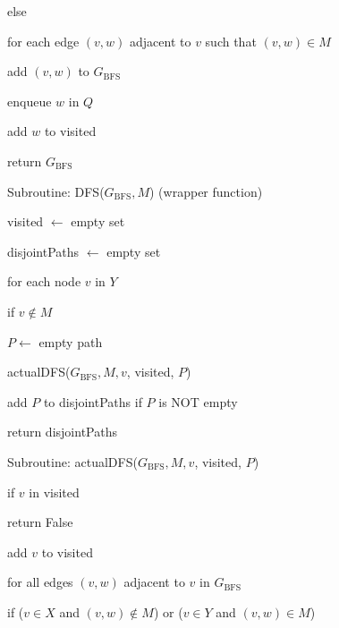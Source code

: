 \documentclass{article}
\begin{document}
\hspace{2cm} else

\hspace{3cm} for each edge $(v, w)$ adjacent to $v$ such that $(v, w) \in M$

\hspace{4cm} add $(v, w)$ to $G_{\mathrm{BFS}}$

\hspace{4cm} enqueue $w$ in $Q$

\hspace{4cm} add $w$ to visited

\hspace{1cm} return $G_{\mathrm{BFS}}$

Subroutine: DFS($G_{\mathrm{BFS}}, M$) (wrapper function) \dotfill

\hspace{1cm} visited $\leftarrow$ empty set

\hspace{1cm} disjointPaths $\leftarrow$ empty set

\hspace{1cm} for each node $v$ in $Y$

\hspace{2cm} if $v \notin M$

\hspace{3cm} $P \leftarrow$ empty path 

\hspace{3cm} actualDFS($G_{\mathrm{BFS}}, M, v$, visited, $P$)

\hspace{3cm} add $P$ to disjointPaths if $P$ is NOT empty

\hspace{1cm} return disjointPaths

\vspace{0.5cm}

Subroutine: actualDFS($G_{\mathrm{BFS}}, M, v$, visited, $P$) \dotfill

\hspace{1cm} if $v$ in visited

\hspace{2cm} return False

\hspace{1cm} add $v$ to visited

\hspace{1cm} for all edges $(v, w)$ adjacent to $v$ in $G_{\mathrm{BFS}}$

\hspace{2cm} if ($v \in X$ and $(v,w) \notin M$) or ($v \in Y$ and $(v,w) \in M$)
\end{document}
